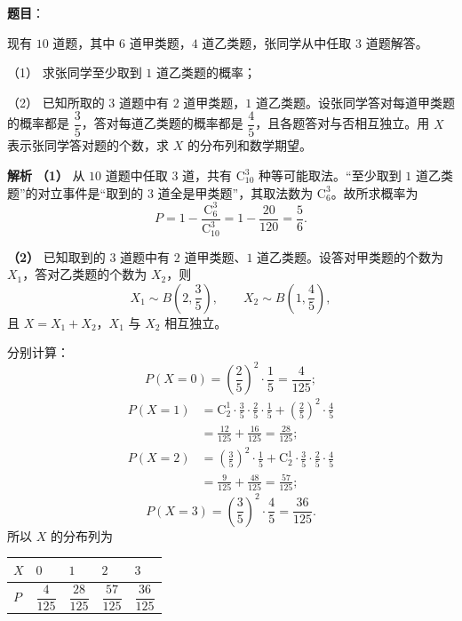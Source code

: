 \begin{answer}

\textbf{题目}：

现有 $10$ 道题，其中 $6$ 道甲类题，$4$ 道乙类题，张同学从中任取 $3$ 道题解答。

（1） 求张同学至少取到 $1$ 道乙类题的概率；

（2） 已知所取的 $3$ 道题中有 $2$ 道甲类题，$1$ 道乙类题。设张同学答对每道甲类题的概率都是 $\dfrac35$，答对每道乙类题的概率都是 $\dfrac45$，且各题答对与否相互独立。用 $X$ 表示张同学答对题的个数，求 $X$ 的分布列和数学期望。

\textbf{解析}
\textbf{（1）} 从 $10$ 道题中任取 $3$ 道，共有 $\mathrm C_{10}^3$ 种等可能取法。“至少取到 $1$ 道乙类题”的对立事件是“取到的 $3$ 道全是甲类题”，其取法数为 $\mathrm C_6^3$。故所求概率为
\nopagebreak[4]
\[P=1-\frac{\mathrm C_6^3}{\mathrm C_{10}^3}
=1-\frac{20}{120}
=\frac56.\]

\textbf{（2）} 已知取到的 $3$ 道题中有 $2$ 道甲类题、$1$ 道乙类题。设答对甲类题的个数为 $X_1$，答对乙类题的个数为 $X_2$，则
\nopagebreak[4]
\[X_1\sim B\left(2,\frac35\right),\qquad X_2\sim B\left(1,\frac45\right),\]
且 $X=X_1+X_2$，$X_1$ 与 $X_2$ 相互独立。

分别计算：
\nopagebreak[4]
\[P(X=0)=\left(\frac25\right)^2\cdot\frac15=\frac4{125};\]
\nopagebreak[4]
\[\begin{aligned}
P(X=1)&=\mathrm C_2^1\cdot\frac35\cdot\frac25\cdot\frac15+\left(\frac25\right)^2\cdot\frac45\\
&=\frac{12}{125}+\frac{16}{125}=\frac{28}{125};
\end{aligned}\]
\nopagebreak[4]
\[\begin{aligned}
P(X=2)&=\left(\frac35\right)^2\cdot\frac15+\mathrm C_2^1\cdot\frac35\cdot\frac25\cdot\frac45\\
&=\frac9{125}+\frac{48}{125}=\frac{57}{125};
\end{aligned}\]
\nopagebreak[4]
\[P(X=3)=\left(\frac35\right)^2\cdot\frac45=\frac{36}{125}.\]
所以 $X$ 的分布列为

\begin{center}
\begin{tabular}{lllll}
\toprule
$X$ & $0$ & $1$ & $2$ & $3$ \\
\midrule
$P$ & $\dfrac4{125}$ & $\dfrac{28}{125}$ & $\dfrac{57}{125}$ & $\dfrac{36}{125}$ \\
\bottomrule
\end{tabular}
\end{center}


\end{answer}
